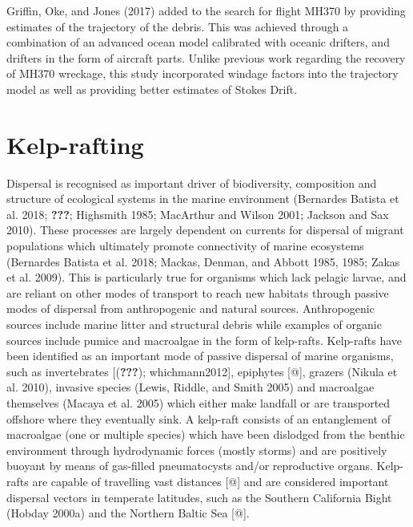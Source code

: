 \documentclass[
]{article}
\begin{document}
Griffin, Oke, and Jones (2017) added to the search for flight MH370 by
providing estimates of the trajectory of the debris. This was achieved
through a combination of an advanced ocean model calibrated with oceanic
drifters, and drifters in the form of aircraft parts. Unlike previous
work regarding the recovery of MH370 wreckage, this study incorporated
windage factors into the trajectory model as well as providing better
estimates of Stokes Drift.

\hypertarget{kelp-rafting}{%
\section{Kelp-rafting}\label{kelp-rafting}}

Dispersal is recognised as important driver of biodiversity, composition
and structure of ecological systems in the marine environment (Bernardes
Batista et al. 2018; {\textbf{???}}; Highsmith 1985; MacArthur and
Wilson 2001; Jackson and Sax 2010). These processes are largely
dependent on currents for dispersal of migrant populations which
ultimately promote connectivity of marine ecosystems (Bernardes Batista
et al. 2018; Mackas, Denman, and Abbott 1985, 1985; Zakas et al. 2009).
This is particularly true for organisms which lack pelagic larvae, and
are reliant on other modes of transport to reach new habitats through
passive modes of dispersal from anthropogenic and natural sources.
Anthropogenic sources include marine litter and structural debris while
examples of organic sources include pumice and macroalgae in the form of
kelp-rafts. Kelp-rafts have been identified as an important mode of
passive dispersal of marine organisms, such as invertebrates
{[}({\textbf{???}}); whichmann2012{]}, epiphytes {[}@{]}, grazers
(Nikula et al. 2010), invasive species (Lewis, Riddle, and Smith 2005)
and macroalgae themselves (Macaya et al. 2005) which either make
landfall or are transported offshore where they eventually sink. A
kelp-raft consists of an entanglement of macroalgae (one or multiple
species) which have been dislodged from the benthic environment through
hydrodynamic forces (mostly storms) and are positively buoyant by means
of gas-filled pneumatocysts and/or reproductive organs. Kelp-rafts are
capable of travelling vast distances {[}@{]} and are considered
important dispersal vectors in temperate latitudes, such as the Southern
California Bight (Hobday 2000a) and the Northern Baltic Sea {[}@{]}.
\end{document}
